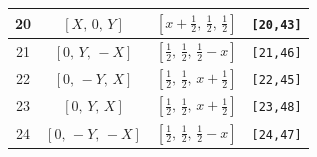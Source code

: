\documentclass[fleqn,8pt]{jsarticle}
\begin{document}
\begin{longtable}{cccc}
20 & $\left[ X,\, 0,\, Y \right]$ & $\left[ x + \frac{1}{2},\, \frac{1}{2},\, \frac{1}{2} \right]$ & {\tt [20,43]} \\ \hline
21 & $\left[ 0,\, Y,\, - X \right]$ & $\left[ \frac{1}{2},\, \frac{1}{2},\, \frac{1}{2} - x \right]$ & {\tt [21,46]} \\ \hline
22 & $\left[ 0,\, - Y,\, X \right]$ & $\left[ \frac{1}{2},\, \frac{1}{2},\, x + \frac{1}{2} \right]$ & {\tt [22,45]} \\ \hline
23 & $\left[ 0,\, Y,\, X \right]$ & $\left[ \frac{1}{2},\, \frac{1}{2},\, x + \frac{1}{2} \right]$ & {\tt [23,48]} \\ \hline
24 & $\left[ 0,\, - Y,\, - X \right]$ & $\left[ \frac{1}{2},\, \frac{1}{2},\, \frac{1}{2} - x \right]$ & {\tt [24,47]} \\
\end{longtable}
\renewcommand{\arraystretch}{1.2}
\end{document}

